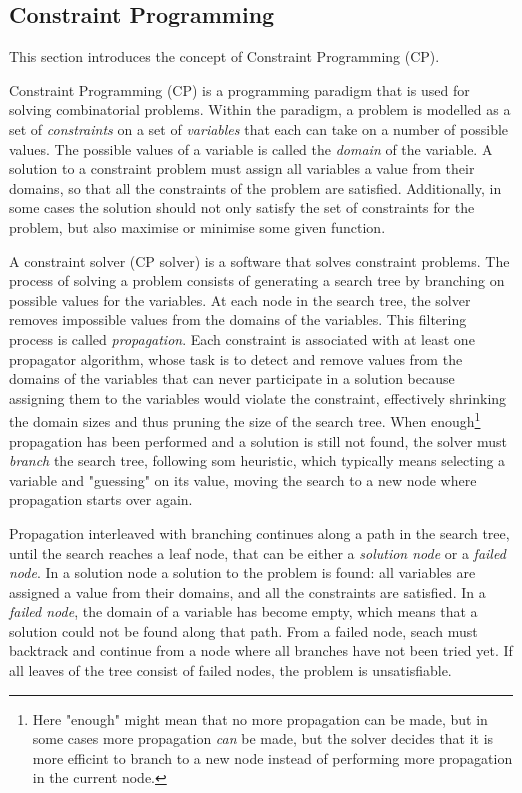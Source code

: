 \documentclass[a4paper,11pt]{article}
\numberwithin{equation}{section}
\begin{document}
\subsection{Constraint Programming}
\label{bg:cp}
This section introduces the concept of Constraint Programming (CP).

Constraint Programming (CP) is a programming paradigm that is used for solving
combinatorial problems. Within the paradigm, a problem is
modelled as a set of \emph{constraints} on a
set of \emph{variables} that each can take on a number of
possible values. The possible values of 
a variable is called the \emph{domain} of the variable.
A solution to a constraint problem must assign all variables
a value from their domains, so that all the constraints of the problem
are satisfied. Additionally, in some cases the solution should not only
satisfy the set of constraints for the
problem, but also maximise or minimise some given function.

A constraint solver (CP solver) is a software that solves constraint problems.
The process of solving a problem consists of generating a search tree by branching
on possible values for the variables. At each node in the search tree,
the solver removes impossible values from the domains of the variables.
This filtering process is called \emph{propagation}. Each constraint is
associated with at least one propagator algorithm, whose task is to detect
and remove values from the domains of the variables
that can never participate in a solution because assigning them to
the variables would violate the constraint,
effectively shrinking the domain sizes and thus 
pruning the size of the search tree.
When enough\footnote{Here "enough" might mean that no more propagation can be made,
  but in some cases more propagation \emph{can} be made, but the
  solver decides that it is more efficint to branch to a new node instead of 
  performing more propagation in the current node.}
propagation has been performed and a solution is still not found,
the solver must \emph{branch} the search tree, following som heuristic,
which typically means selecting a variable and "guessing" on its value,
moving the search to a new node where propagation starts over again.

Propagation interleaved with branching continues along a path in the search tree,
until the search reaches a leaf node, that can be either a
\emph{solution node} or a \emph{failed node}.
In a solution node a solution to the problem is found:
all variables are assigned a value
from their domains, and all the constraints are satisfied.
In a \emph{failed node}, the domain of a variable has become empty, which
means that a solution could not be found along that path.
From a failed node, seach must backtrack and continue from a node where all branches
have not been tried yet. If all leaves of the tree consist of failed nodes,
the problem is unsatisfiable.
\end{document}

